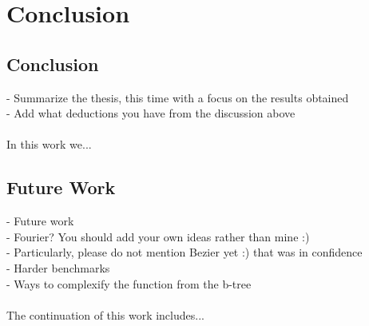 
\chapter{Conclusion}
\label{ch:conclusions}

\section{Conclusion}
- Summarize the thesis, this time with a focus on the results obtained \\
- Add what deductions you have from the discussion above \\ \\
In this work we...

\section{Future Work}
- Future work \\
  - Fourier? You should add your own ideas rather than mine :) \\
  - Particularly, please do not mention Bezier yet :) that was in confidence \\
  - Harder benchmarks \\
  - Ways to complexify the function from the b-tree \\ \\
The continuation of this work includes...
